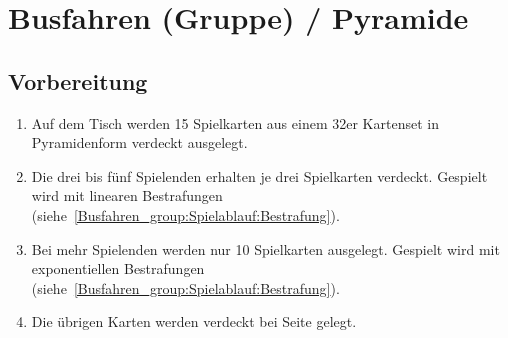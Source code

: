 \chapter{Busfahren (Gruppe) / Pyramide}
\section{Vorbereitung}
\begin{enumerate}[label={(\arabic*)}]
    \item Auf dem Tisch werden 15 Spielkarten aus einem 32er Kartenset in Pyramidenform verdeckt ausgelegt.
    \item Die drei bis fünf Spielenden erhalten je drei Spielkarten verdeckt. Gespielt wird mit linearen Bestrafungen (siehe~\ref{Busfahren_group:Spielablauf:Bestrafung}).
    \item Bei mehr Spielenden werden nur 10 Spielkarten ausgelegt. Gespielt wird mit exponentiellen Bestrafungen (siehe~\ref{Busfahren_group:Spielablauf:Bestrafung}).
    \item Die übrigen Karten werden verdeckt bei Seite gelegt.
\end{enumerate}

